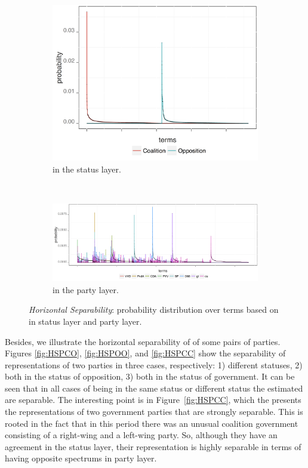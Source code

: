 \begin{figure}[t]
    \centering
    \begin{subfigure}[b]{0.32\textwidth}
\includegraphics[width=\linewidth]{02-part-01/chapter-03/figs_and_tables/img_opo-coa.png}
\caption{\label{fig:HSS}\achswlm in the status layer.}
        \end{subfigure}
        ~ 
    \begin{subfigure}[b]{0.64\textwidth}
\includegraphics[width=\linewidth]{02-part-01/chapter-03/figs_and_tables/img_parties.png}
\caption{\label{fig:HSP}\achswlm in the party layer.}
        \end{subfigure}
    \caption{\label{fig:HS} \emph{Horizontal Separability}: probability distribution over terms based on \hswlms in status layer and party layer.}
\end{figure}

Besides, we illustrate the horizontal separability of \achswlm of some pairs of parties. Figures \ref{fig:HSPCO}, \ref{fig:HSPOO}, and \ref{fig:HSPCC} show the separability of representations of two parties in three cases, respectively: 1) different statuses, 2) both in the status of opposition, 3) both in the status of government. It can be seen that in all cases of being in the same status or different status the estimated \hswlms are separable. The interesting point is in Figure~\ref{fig:HSPCC}, which the presents the representations of two government parties that are strongly separable. This is rooted in the fact that in this period there was an unusual coalition government consisting of a right-wing and a left-wing party. So, although they have an agreement in the status layer, their representation is highly separable in terms of having opposite spectrums in party layer.


